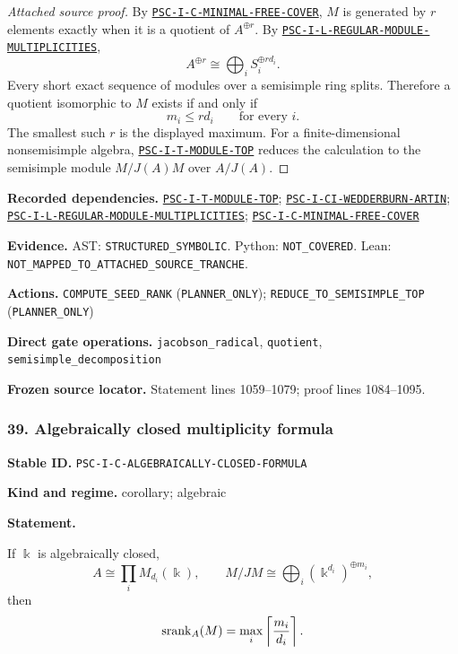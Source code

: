 \documentclass[a4paper,11pt]{article}
\newcommand{\bbk}{\Bbbk}\newcommand{\A}{\mathcal A}\newcommand{\B}{\mathcal B}\newcommand{\Ccal}{\mathcal C}\newcommand{\Pcal}{\mathcal P}\newcommand{\Qcal}{\mathcal Q}\newcommand{\Rcal}{\mathcal R}\newcommand{\Scal}{\mathcal S}
\newcommand{\field}[2]{\noindent\textbf{#1.} #2\par}
\begin{document}
\begin{proof}[Attached source proof]
By \hyperref[rec:PSC-I-C-MINIMAL-FREE-COVER]{\nolinkurl{PSC-I-C-MINIMAL-FREE-COVER}}, $M$ is generated by $r$ elements exactly when it is a quotient of $A^{\oplus r}$.  By \hyperref[rec:PSC-I-L-REGULAR-MODULE-MULTIPLICITIES]{\nolinkurl{PSC-I-L-REGULAR-MODULE-MULTIPLICITIES}},
\[
A^{\oplus r}\cong\bigoplus_iS_i^{\oplus rd_i}.
\]
Every short exact sequence of modules over a semisimple ring splits.  Therefore a quotient isomorphic to $M$ exists if and only if
\[
m_i\leq rd_i
\qquad\text{for every }i.
\]
The smallest such $r$ is the displayed maximum.  For a finite-dimensional nonsemisimple algebra, \hyperref[rec:PSC-I-T-MODULE-TOP]{\nolinkurl{PSC-I-T-MODULE-TOP}} reduces the calculation to the semisimple module $M/J(A)M$ over $A/J(A)$.
\end{proof}
\field{Recorded dependencies}{\hyperref[rec:PSC-I-T-MODULE-TOP]{\nolinkurl{PSC-I-T-MODULE-TOP}}; \hyperref[rec:PSC-I-CI-WEDDERBURN-ARTIN]{\nolinkurl{PSC-I-CI-WEDDERBURN-ARTIN}}; \hyperref[rec:PSC-I-L-REGULAR-MODULE-MULTIPLICITIES]{\nolinkurl{PSC-I-L-REGULAR-MODULE-MULTIPLICITIES}}; \hyperref[rec:PSC-I-C-MINIMAL-FREE-COVER]{\nolinkurl{PSC-I-C-MINIMAL-FREE-COVER}}}
\field{Evidence}{AST: \nolinkurl{STRUCTURED_SYMBOLIC}. Python: \nolinkurl{NOT_COVERED}. Lean: \nolinkurl{NOT_MAPPED_TO_ATTACHED_SOURCE_TRANCHE}.}
\field{Actions}{\nolinkurl{COMPUTE_SEED_RANK} (\nolinkurl{PLANNER_ONLY}); \nolinkurl{REDUCE_TO_SEMISIMPLE_TOP} (\nolinkurl{PLANNER_ONLY})}
\field{Direct gate operations}{\nolinkurl{jacobson_radical}, \nolinkurl{quotient}, \nolinkurl{semisimple_decomposition}}
\field{Frozen source locator}{Statement lines 1059--1079; proof lines 1084--1095.}
\subsubsection*{39. Algebraically closed multiplicity formula}
\label{rec:PSC-I-C-ALGEBRAICALLY-CLOSED-FORMULA}
\field{Stable ID}{\nolinkurl{PSC-I-C-ALGEBRAICALLY-CLOSED-FORMULA}}
\field{Kind and regime}{corollary; algebraic}
\textbf{Statement.}\par
If $\bbk$ is algebraically closed,
\[
A\cong\prod_iM_{d_i}(\bbk),
\qquad
M/JM\cong\bigoplus_i(\bbk^{d_i})^{\oplus m_i},
\]
then
\[
\operatorname{srank}_A(M)=\max_i\left\lceil\frac{m_i}{d_i}\right\rceil.
\]
\end{document}
